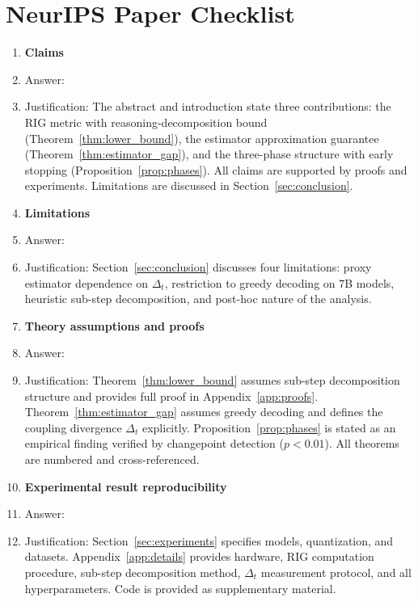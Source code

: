 \section*{NeurIPS Paper Checklist}

\begin{enumerate}

\item {\bf Claims}
    \item[] Answer: \answerYes{}
    \item[] Justification: The abstract and introduction state three contributions: the RIG metric with reasoning-decomposition bound (Theorem~\ref{thm:lower_bound}), the estimator approximation guarantee (Theorem~\ref{thm:estimator_gap}), and the three-phase structure with early stopping (Proposition~\ref{prop:phases}). All claims are supported by proofs and experiments. Limitations are discussed in Section~\ref{sec:conclusion}.

\item {\bf Limitations}
    \item[] Answer: \answerYes{}
    \item[] Justification: Section~\ref{sec:conclusion} discusses four limitations: proxy estimator dependence on $\Delta_t$, restriction to greedy decoding on 7B models, heuristic sub-step decomposition, and post-hoc nature of the analysis.

\item {\bf Theory assumptions and proofs}
    \item[] Answer: \answerYes{}
    \item[] Justification: Theorem~\ref{thm:lower_bound} assumes sub-step decomposition structure and provides full proof in Appendix~\ref{app:proofs}. Theorem~\ref{thm:estimator_gap} assumes greedy decoding and defines the coupling divergence $\Delta_t$ explicitly. Proposition~\ref{prop:phases} is stated as an empirical finding verified by changepoint detection ($p < 0.01$). All theorems are numbered and cross-referenced.

    \item {\bf Experimental result reproducibility}
    \item[] Answer: \answerYes{}
    \item[] Justification: Section~\ref{sec:experiments} specifies models, quantization, and datasets. Appendix~\ref{app:details} provides hardware, RIG computation procedure, sub-step decomposition method, $\Delta_t$ measurement protocol, and all hyperparameters. Code is provided as supplementary material.


\end{enumerate}
